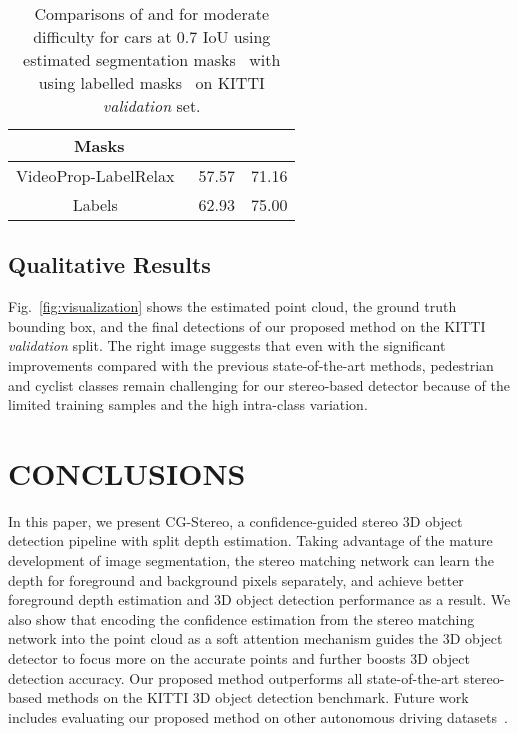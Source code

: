 \documentclass[letterpaper, 10 pt, conference]{ieeeconf}
\begin{document}
\begin{table}[h!]
\centering
    \begin{tabular}{|c||c|c|}
		\hline
		Masks &   &    \\
		\hline
		VideoProp-LabelRelax~\cite{zhu2019improving} & 57.57 & 71.16 \\
		\hline
		Labels~\cite{chen2014beat}         & 62.93 & 75.00 \\
		\hline
	\end{tabular}
   \caption{Comparisons of  and  for moderate difficulty for cars at 0.7 IoU using estimated segmentation masks~\cite{zhu2019improving} with using labelled masks~\cite{chen2014beat} on KITTI \emph{validation} set.}
   \label{tab:ablation_mask}
\end{table}

\subsection{Qualitative Results}
Fig.~\ref{fig:visualization} shows the estimated point cloud, the ground truth bounding box, and the final detections of our proposed method on the KITTI \emph{validation} split. The right image suggests that even with the significant improvements compared with the previous state-of-the-art methods, pedestrian and cyclist classes remain challenging for our stereo-based detector because of the limited training samples and the high intra-class variation.


\section{CONCLUSIONS}
In this paper, we present CG-Stereo, a confidence-guided stereo 3D object detection pipeline with split depth estimation. Taking advantage of the mature development of image segmentation, the stereo matching network can learn the depth for foreground and background pixels separately, and achieve better foreground depth estimation and 3D object detection performance as a result. We also show that encoding the confidence estimation from the stereo matching network into the point cloud as a soft attention mechanism guides the 3D object detector to focus more on the accurate points and further boosts 3D object detection accuracy. Our proposed method outperforms all state-of-the-art stereo-based methods on the KITTI 3D object detection benchmark. Future work includes evaluating our proposed method on other autonomous driving datasets~\cite{sun2019scalability, caesar2019nuscenes, pitropov2020canadian}. 
\newpage
{


}
\end{document}

